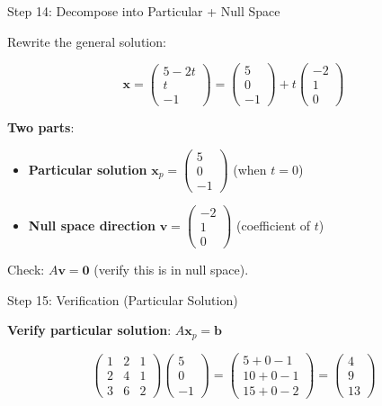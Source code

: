 \documentclass[10pt]{beamer}
\theoremstyle{definition}
\newcommand{\x}[1]{\alert{\textbf{#1}}}
\begin{document}
\begin{frame}{Step 14: Decompose into Particular + Null Space}

Rewrite the general solution:

$$\mathbf{x} = \begin{pmatrix} 5 - 2t \\ t \\ -1 \end{pmatrix} = \begin{pmatrix} 5 \\ 0 \\ -1 \end{pmatrix} + t \begin{pmatrix} -2 \\ 1 \\ 0 \end{pmatrix}$$

\vspace{1em}

\x{Two parts}:
\begin{itemize}
\item \x{Particular solution} $\mathbf{x}_p = \begin{pmatrix} 5 \\ 0 \\ -1 \end{pmatrix}$ (when $t=0$)
\item \x{Null space direction} $\mathbf{v} = \begin{pmatrix} -2 \\ 1 \\ 0 \end{pmatrix}$ (coefficient of $t$)
\end{itemize}

\vspace{1em}

Check: $A\mathbf{v} = \mathbf{0}$ (verify this is in null space).

\end{frame}

\begin{frame}{Step 15: Verification (Particular Solution)}

\x{Verify particular solution}: $A\mathbf{x}_p = \mathbf{b}$

$$\begin{pmatrix} 1&2&1 \\ 2&4&1 \\ 3&6&2 \end{pmatrix} \begin{pmatrix} 5\\0\\-1 \end{pmatrix} = \begin{pmatrix} 5+0-1 \\ 10+0-1 \\ 15+0-2 \end{pmatrix} = \begin{pmatrix} 4\\9\\13 \end{pmatrix}$$ \checkmark

\end{frame}
\end{document}
